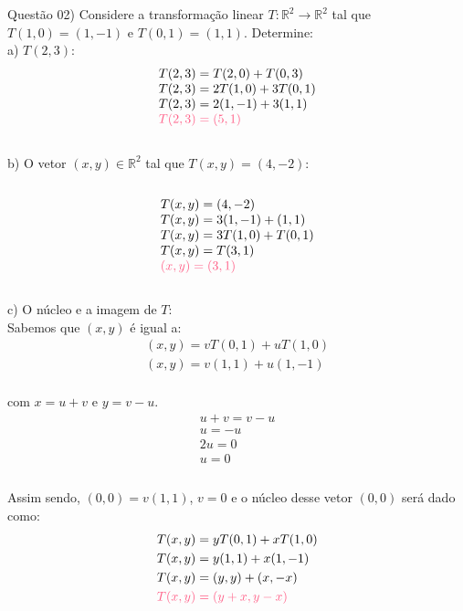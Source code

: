 
\noindent \textcolor{COLOR1}{Questão 02)} Considere a transformação linear $T: \mathbb{R}^2\to \mathbb{R}^2$ tal que $T(1,0)=(1,-1)$ e $T(0,1)=(1,1)$. Determine:\\

a) $T(2,3)$:\\

\[
    \begin{array}{l}
        T(2,3) = T(2,0) + T(0,3)   \\
        T(2,3) = 2T(1,0) + 3T(0,1) \\
        T(2,3) = 2(1,-1) + 3(1,1)  \\
        \textcolor{COLOR2}{T(2,3) = (5,1)}
    \end{array}
\]\\

b) O vetor $(x,y)\in \mathbb{R}^2 $ tal que $T(x,y)=\left(4,-2\right)$:\\
\\

\[
    \begin{array}{l}
        T(x,y) = (4,-2)           \\
        T(x,y) = 3(1,-1) + (1,1)  \\
        T(x,y) = 3T(1,0) + T(0,1) \\
        T(x,y) = T(3,1)           \\
        \textcolor{COLOR2}{(x,y) = (3,1)}
    \end{array}
\]
\\

c) O núcleo e a imagem de $T$:\\

Sabemos que $(x,y)$ é igual a:\\

\[
    \begin{array}{l}
        (x,y) = vT(0,1) + uT(1,0) \\
        (x,y) = v(1,1) + u(1,-1)
    \end{array}
\]
\\

com $x=u+v$ e $y=v-u$.\\

\[
    \begin{array}{l}
        u+v=v-u \\
        u=-u    \\
        2u=0    \\
        u=0     \\
    \end{array}
\]
\\

Assim sendo, $(0,0)=v(1,1)$, $v=0$ e o núcleo desse vetor $(0,0)$ será dado como:\\

\[
    \begin{split}
        &T(x,y) = yT(0,1) + xT(1,0) \\
        &T(x,y) = y(1,1) + x(1,-1) \\
        &T(x,y) = (y,y) + (x,-x) \\
        &\textcolor{COLOR2}{T(x,y) = (y+x,y-x)}
    \end{split}
\]\\
